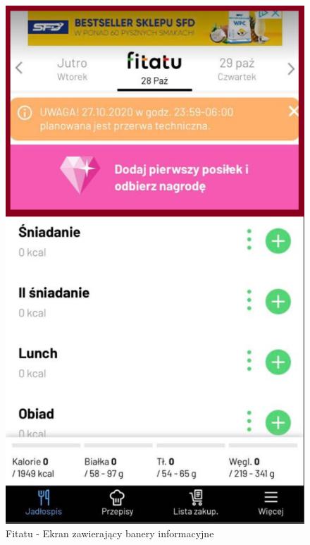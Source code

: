\documentclass[12pt, a4paper]{article}
\begin{document}
\begin{sloppypar}
{{{      \begin{figure}[H]
        \centering
        \includegraphics[width=.3\textwidth]{fitatu_con_1.png}
        \caption{Fitatu - Ekran zawierający banery informacyjne}
        \label{fig:fit4}
      \end{figure}
        
    }
}}
\end{sloppypar}
\end{document}
